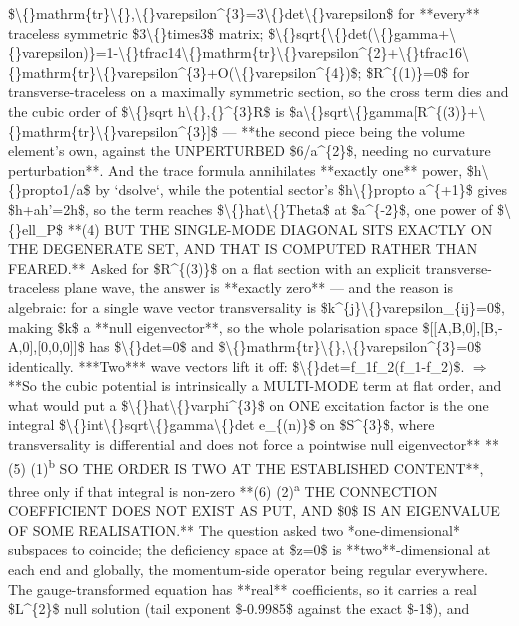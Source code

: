 \begin{description}
\$\textbackslash\{\}mathrm\{tr\}\textbackslash\{\},\textbackslash\{\}varepsilon\textasciicircum{}\{3\}=3\textbackslash\{\}det\textbackslash\{\}varepsilon\$ for **every** traceless symmetric \$3\textbackslash\{\}times3\$ matrix; \$\textbackslash\{\}sqrt\{\textbackslash\{\}det(\textbackslash\{\}gamma+\textbackslash\{\}varepsilon)\}=1-\textbackslash\{\}tfrac14\textbackslash\{\}mathrm\{tr\}\textbackslash\{\}varepsilon\textasciicircum{}\{2\}+\textbackslash\{\}tfrac16\textbackslash\{\}mathrm\{tr\}\textbackslash\{\}varepsilon\textasciicircum{}\{3\}+O(\textbackslash\{\}varepsilon\textasciicircum{}\{4\})\$; \$R\textasciicircum{}\{(1)\}=0\$ for transverse-traceless on a maximally symmetric section, so the cross term dies and the cubic order of \$\textbackslash\{\}sqrt h\textbackslash\{\},\{\}\textasciicircum{}\{3\}R\$ is \$a\textbackslash\{\}sqrt\textbackslash\{\}gamma[R\textasciicircum{}\{(3)\}+\textbackslash\{\}mathrm\{tr\}\textbackslash\{\}varepsilon\textasciicircum{}\{3\}]\$ --- **the second piece being the volume element's own, against the UNPERTURBED \$6/a\textasciicircum{}\{2\}\$, needing no curvature perturbation**. And the trace formula annihilates **exactly one** power, \$h\textbackslash\{\}propto1/a\$ by `dsolve`, while the potential sector's \$h\textbackslash\{\}propto a\textasciicircum{}\{+1\}\$ gives \$h+ah'=2h\$, so the term reaches \$\textbackslash\{\}hat\textbackslash\{\}Theta\$ at \$a\textasciicircum{}\{-2\}\$, one power of \$\textbackslash\{\}ell\_P\$  **(4)  BUT THE SINGLE-MODE DIAGONAL SITS EXACTLY ON THE DEGENERATE SET, AND THAT IS COMPUTED RATHER THAN FEARED.** Asked for \$R\textasciicircum{}\{(3)\}\$ on a flat section with an explicit transverse-traceless plane wave, the answer is **exactly zero** --- and the reason is algebraic: for a single wave vector transversality is \$k\textasciicircum{}\{j\}\textbackslash\{\}varepsilon\_\{ij\}=0\$, making \$k\$ a **null eigenvector**, so the whole polarisation space \$[[A,B,0],[B,-A,0],[0,0,0]]\$ has \$\textbackslash\{\}det=0\$ and \$\textbackslash\{\}mathrm\{tr\}\textbackslash\{\},\textbackslash\{\}varepsilon\textasciicircum{}\{3\}=0\$ identically. ***Two*** wave vectors lift it off: \$\textbackslash\{\}det=f\_1f\_2(f\_1-f\_2)\$. \ensuremath{\Rightarrow} **So the cubic potential is intrinsically a MULTI-MODE term at flat order, and what would put a \$\textbackslash\{\}hat\textbackslash\{\}varphi\textasciicircum{}\{3\}\$ on ONE excitation factor is the one integral \$\textbackslash\{\}int\textbackslash\{\}sqrt\textbackslash\{\}gamma\textbackslash\{\}det e\_\{(n)\}\$ on \$S\textasciicircum{}\{3\}\$, where transversality is differential and does not force a pointwise null eigenvector**  **(5) (1)\textsuperscript{b} SO THE ORDER IS TWO AT THE ESTABLISHED CONTENT**, three only if that integral is non-zero  **(6) (2)\textsuperscript{a} THE CONNECTION COEFFICIENT DOES NOT EXIST AS PUT, AND \$0\$ IS AN EIGENVALUE OF SOME REALISATION.** The question asked two *one-dimensional* subspaces to coincide; the deficiency space at \$z=0\$ is **two**-dimensional at each end and globally, the momentum-side operator being regular everywhere. The gauge-transformed equation has **real** coefficients, so it carries a real \$L\textasciicircum{}\{2\}\$ null solution (tail exponent \$-0.9985\$ against the exact \$-1\$), and 
\end{description}
